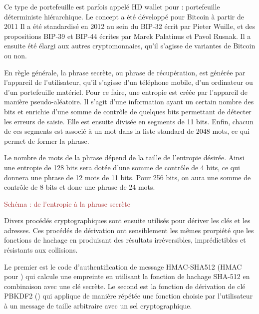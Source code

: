 Ce type de portefeuille est parfois appelé HD wallet pour  : portefeuille déterministe hiérarchique. Le concept a été développé pour Bitcoin à partir de 2011 Il a été standardisé en 2012 au sein du BIP-32 écrit par Pieter Wuille, et des propositions BIP-39 et BIP-44 écrites par Marek Palatinus et Pavol Rusnak. Il a ensuite été élargi aux autres cryptomonnaies, qu'il s'agisse de variantes de Bitcoin ou non.


En règle générale, la phrase secrète, ou phrase de récupération, est générée par l'appareil de l'utilisateur, qu'il s'agisse d'un téléphone mobile, d'un ordinateur ou d'un portefeuille matériel. Pour ce faire, une entropie est créée par l'appareil de manière pseudo-aléatoire. Il s'agit d'une information ayant un certain nombre des bits et enrichie d'une somme de contrôle de quelques bits permettant de détecter les erreurs de saisie. Elle est ensuite divisée en segments de 11 bits. Enfin, chacun de ces segments est associé à un mot dans la liste standard de 2048 mots, ce qui permet de former la phrase. %

Le nombre de mots de la phrase dépend de la taille de l'entropie désirée. Ainsi une entropie de 128 bits sera dotée d'une somme de contrôle de 4 bits, ce qui donnera une phrase de 12 mots de 11 bits. Pour 256 bits, on aura une somme de contrôle de 8 bits et donc une phrase de 24 mots.

\textcolor{brown}{Schéma : de l'entropie à la phrase secrète}


Divers procédés cryptographiques sont ensuite utilisés pour dériver les clés et les adresses. Ces procédés de dérivation ont sensiblement les mêmes prorpiété que les fonctions de hachage en produisant des résultats irréversibles, imprédictibles et résistants aux collisions.

Le premier est le code d'authentification de message HMAC-SHA512 (HMAC pour ) qui calcule une empreinte en utilisant la fonction de hachage SHA-512 en combinaison avec une clé secrète. Le second est la fonction de dérivation de clé PBKDF2 () qui applique de manière répétée une fonction choisie par l'utilisateur à un message de taille arbitraire avec un sel cryptographique. 

